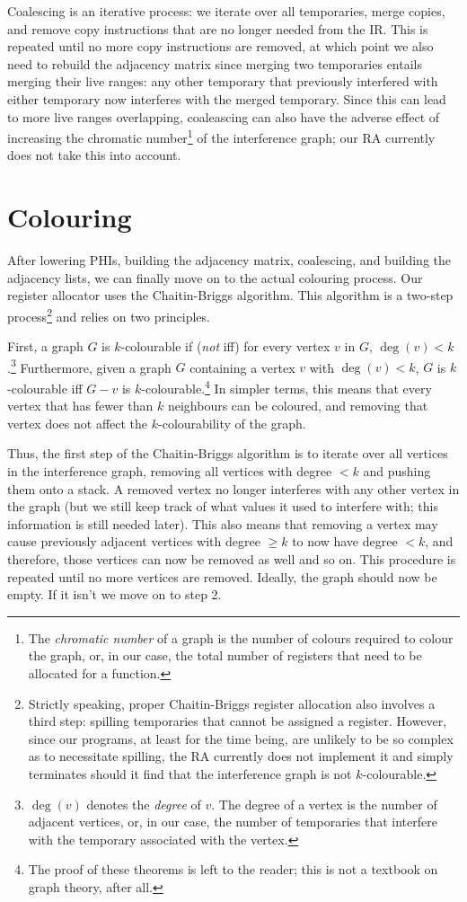 \documentclass[12pt]{report}
\begin{document}
Coalescing is an iterative process: we iterate over all temporaries, merge copies, and remove copy instructions that are no longer needed
from the IR. This is repeated until no more copy instructions are removed, at which point we also need to rebuild the adjacency matrix
since merging two temporaries entails merging their live ranges: any other temporary that previously interfered with either temporary now
interferes with the merged temporary. Since this can lead to more live ranges overlapping, coaleascing can also have the adverse effect
of increasing the chromatic number\footnote{The \textit{chromatic number} of a graph is the number of colours required to colour the graph,
or, in our case, the total number of registers that need to be allocated for a function.} of the interference graph; our RA currently does
not take this into account.

\section{Colouring}
After lowering PHIs, building the adjacency matrix, coalescing, and building the adjacency lists, we can finally move on to the actual
colouring process. Our register allocator uses the Chaitin-Briggs algorithm. This algorithm is a two-step process\footnote{Strictly
speaking, proper Chaitin-Briggs register allocation also involves a third step: spilling temporaries that cannot be assigned a register.
However, since our programs, at least for the time being, are unlikely to be so complex as to necessitate spilling, the RA currently does
not implement it and simply terminates should it find that the interference graph is not $k$-colourable.} and relies on two
principles.

First, a graph $G$ is $k$-colourable if (\textit{not} iff) for every vertex $v$ in $G$, $\deg(v) < k$.\footnote{$\deg(v)$ denotes the
\textit{degree} of $v$. The degree of a vertex is the number of adjacent vertices, or, in our case, the number of temporaries that
interfere with the temporary associated with the vertex.} Furthermore, given a graph $G$ containing a vertex $v$ with $\deg(v) < k$,
$G$ is $k$-colourable iff $G - v$ is $k$-colourable.\footnote{The proof of these theorems is left to the reader; this is not a textbook
on graph theory, after all.} In simpler terms, this means that every vertex that has fewer than $k$ neighbours
can be coloured, and removing that vertex does not affect the $k$-colourability of the graph.

Thus, the first step of the Chaitin-Briggs algorithm is to iterate over all vertices in the interference graph, removing all vertices
with degree $< k$ and pushing them onto a stack. A removed vertex no longer interferes with any other vertex in the graph (but we still
keep track of what values it used to interfere with; this information is still needed later). This also means that removing a vertex may
cause previously adjacent vertices with degree $\geq k$ to now have degree $< k$, and therefore, those vertices can now be removed as well
and so on. This procedure is repeated until no more vertices are removed. Ideally, the graph should now be empty. If it isn't we move on
to step 2.
\end{document}
